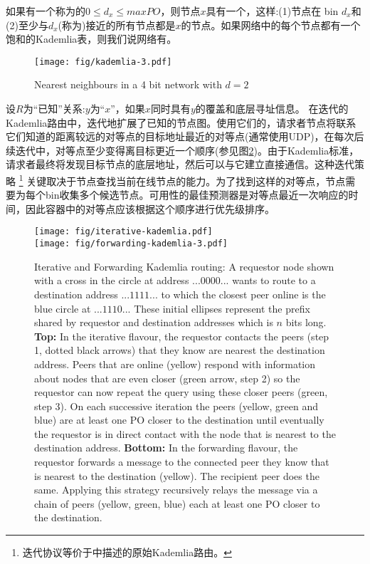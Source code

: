 如果有一个称为的$0\leq d_x\leq \mathit{maxPO}$，则节点$x$具有一个，这样:(1)节点在 bin $d_x$和(2)至少与$d_x$(称为)接近的所有节点都是$x$的节点。如果网络中的每个节点都有一个饱和的Kademlia表，则我们说网络有。

\begin{figure}[htbp]
   \centering
    \texttt{[image: fig/kademlia-3.pdf]}
   \caption[Nearest neighbours \statusgreen]{Nearest neighbours in a 4 bit network with $d = 2$ }
   \label{fig:bin-density}
\end{figure}

设$R$为“已知”关系:$y$为“$x$”，如果$x$同时具有$y$的覆盖和底层寻址信息。 
在迭代的Kademlia路由中，迭代地扩展了已知的节点图。使用它们的，请求者节点将联系它们知道的距离较远的对等点的目标地址最近的对等点(通常使用UDP)，在每次后续迭代中，对等点至少变得离目标更近一个顺序(参见图\ref{fig:iterative-forwarding-kademlia})。由于Kademlia标准，请求者最终将发现目标节点的底层地址，然后可以与它建立直接通信。这种迭代策略%
%
\footnote{迭代协议等价于\cite{maymounkov2002kademlia}中描述的原始Kademlia路由。
}
%
关键取决于节点查找当前在线节点的能力。为了找到这样的对等点，节点需要为每个bin收集多个候选节点。可用性的最佳预测器是对等点最近一次响应的时间，因此容器中的对等点应该根据这个顺序进行优先级排序。

\begin{figure}[htbp]
   \centering
   \vspace{-2cm} 
   \texttt{[image: fig/iterative-kademlia.pdf]}\\\vspace{-1.3cm}
   \texttt{[image: fig/forwarding-kademlia-3.pdf]}
   \caption[Iterative and Forwarding Kademlia routing \statusgreen]{Iterative and Forwarding Kademlia routing: A requestor node shown with a cross in the circle at address $...0000...$ wants to route to a destination address $...1111...$ to which the closest peer online is the blue circle at $...1110...$ These initial ellipses represent the prefix shared by requestor and destination addresses which is $n$ bits long. \textbf{Top:} In the iterative flavour, the requestor contacts the peers (step 1, dotted black arrows) that they know are nearest the destination address. Peers that are online (yellow) respond with information about nodes that are even closer (green arrow, step 2) so the requestor can now repeat the query using these closer peers (green, step 3). On each successive iteration the peers (yellow, green and blue) are at least one PO closer to the destination until eventually the requestor is in direct contact with the node that is nearest to the destination address. \textbf{Bottom:} In the forwarding flavour, the requestor forwards a message to the connected peer they know that is nearest to the destination (yellow). The recipient peer does the same. Applying this strategy recursively relays the message via a chain of peers (yellow, green, blue) each at least one PO closer to the destination.}
   \label{fig:iterative-forwarding-kademlia}
\end{figure}


